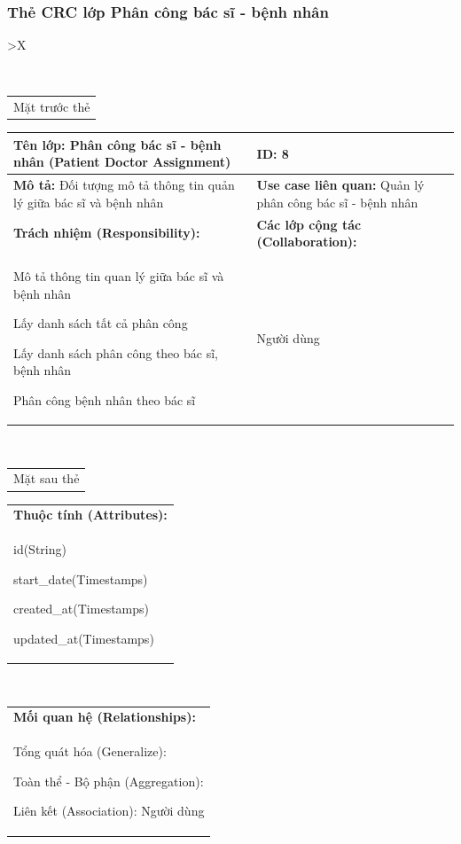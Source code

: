 \subsubsection{Thẻ CRC lớp Phân công bác sĩ - bệnh nhân}
  \begin{xltabular}{\textwidth}{
    >{\centering\arraybackslash}X 
  }
  \caption{\bfseries \fontsize{12pt}{0pt}\selectfont Thẻ CRC lớp Phân công bác sĩ - bệnh nhân}
  \\
  \begin{tabularx}{0.9\textwidth}{X}
    Mặt trước thẻ
  \end{tabularx}
  \begin{tabularx}{0.9\textwidth}{|X|X|}
    \hline
    \textbf{Tên lớp:} Phân công bác sĩ - bệnh nhân (Patient Doctor Assignment) & \textbf{ID:} 8 \\
    \hline
    \textbf{Mô tả:} Đối tượng mô tả thông tin quản lý giữa bác sĩ và bệnh nhân & \textbf{Use case liên quan:} Quản lý phân công bác sĩ - bệnh nhân \\
    \hline
    \textbf{Trách nhiệm (Responsibility):} & \textbf{Các lớp cộng tác (Collaboration):} \\
    Mô tả thông tin quan lý giữa bác sĩ và bệnh nhân

    Lấy danh sách tất cả phân công

    Lấy danh sách phân công theo bác sĩ, bệnh nhân

    Phân công bệnh nhân theo bác sĩ
    & 
    Người dùng
    \\
    \hline
  \end{tabularx}
  \\ 
  \begin{tabularx}{0.9\textwidth}{X}
    Mặt sau thẻ
  \end{tabularx} 
  \begin{tabularx}{0.9\textwidth}{|X|}
    \hline
    \textbf{Thuộc tính (Attributes):} \\
    id(String) 

    start\_date(Timestamps) 
          
    created\_at(Timestamps)

    updated\_at(Timestamps)
    \\
    \hline
  \end{tabularx}
  \\     
  \begin{tabularx}{0.9\textwidth}{|X|}
    \textbf{Mối quan hệ (Relationships):} \\
    Tổng quát hóa (Generalize):

    Toàn thể - Bộ phận (Aggregation): 
    
    Liên kết (Association): Người dùng
    \\
    \hline
  \end{tabularx}
  \end{xltabular}

